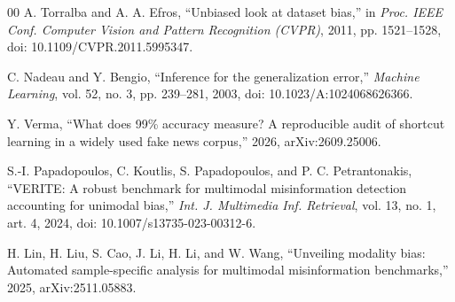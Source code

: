\documentclass[pdflatex,sn-mathphys-num]{sn-jnl}
\begin{document}
\begin{thebibliography}{00}
 A. Torralba and A. A. Efros, ``Unbiased look at dataset
bias,'' in \emph{Proc. IEEE Conf. Computer Vision and Pattern Recognition
(CVPR)}, 2011, pp. 1521--1528, doi: 10.1109/CVPR.2011.5995347.

 C. Nadeau and Y. Bengio, ``Inference for the generalization
error,'' \emph{Machine Learning}, vol. 52, no. 3, pp. 239--281, 2003,
doi: 10.1023/A:1024068626366.

 Y. Verma, ``What does 99\% accuracy measure? A reproducible
audit of shortcut learning in a widely used fake news corpus,'' 2026,
arXiv:2609.25006.

 S.-I. Papadopoulos, C. Koutlis, S. Papadopoulos, and
P. C. Petrantonakis, ``VERITE: A robust benchmark for multimodal misinformation
detection accounting for unimodal bias,'' \emph{Int. J. Multimedia Inf.
Retrieval}, vol. 13, no. 1, art. 4, 2024, doi: 10.1007/s13735-023-00312-6.

 H. Lin, H. Liu, S. Cao, J. Li, H. Li, and W. Wang,
``Unveiling modality bias: Automated sample-specific analysis for multimodal
misinformation benchmarks,'' 2025, arXiv:2511.05883.

\end{thebibliography}
\end{document}
